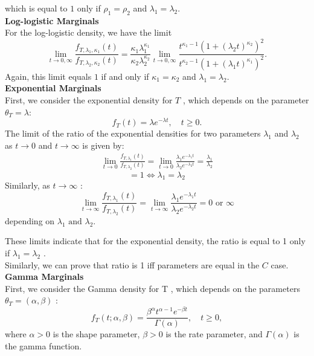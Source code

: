 which is equal to \(1\) only if \(\rho_1 = \rho_2\) and \(\lambda_1 = \lambda_2\).\\
\textbf{Log-logistic Marginals}\\
For the log-logistic density, we have the limit
\[
\lim_{t \to 0, \infty} \frac{f_{T, \lambda_1, \kappa_1}(t)}{f_{T, \lambda_2, \kappa_2}(t)} = \frac{\kappa_1 \lambda_1^{\kappa_1}}{\kappa_2 \lambda_2^{\kappa_2}} \lim_{t \to 0, \infty} \frac{t^{\kappa_1 - 1} \left(1 + (\lambda_2 t)^{\kappa_2}\right)^{2}}{t^{\kappa_2 - 1}  \left(1 + (\lambda_1 t)^{\kappa_1}\right)^{2}}.
\]
Again, this limit equals \(1\) if and only if \(\kappa_1 = \kappa_2\) and \(\lambda_1 = \lambda_2\). \\
\textbf{Exponential Marginals}\\
First, we consider the exponential density for  $T$ , which depends on the parameter  $\theta_T = \lambda$:
$$f_T(t) = \lambda e^{-\lambda t}, \quad t \geq 0.$$
The limit of the ratio of the exponential densities for two parameters  $\lambda_1$  and  $\lambda_2$  as  $t \to 0$  and  $t \to \infty$  is given by:
\begin{align*}
	\lim_{t \to 0} \frac{f_{T, \lambda_1}(t)}{f_{T, \lambda_2}(t)} = \lim_{t \to 0} \frac{\lambda_1 e^{-\lambda_1 t}}{\lambda_2 e^{-\lambda_2 t}} = \frac{\lambda_1}{\lambda_2}
\end{align*}
\begin{equation*}
	= 1 \iff \lambda_1 = \lambda_2
\end{equation*}
Similarly, as  $t \to \infty$ :
\begin{equation*}
\lim_{t \to \infty} \frac{f_{T, \lambda_1}(t)}{f_{T, \lambda_2}(t)} = \lim_{t \to \infty} \frac{\lambda_1 e^{-\lambda_1 t}}{\lambda_2 e^{-\lambda_2 t}} = 0 \text{ or } \infty 
\end{equation*}
depending on \(\lambda_1 \text{ and } \lambda_2.\)

These limits indicate that for the exponential density, the ratio is equal to  1  only if  $\lambda_1 = \lambda_2$ .\\
Similarly, we can prove that ratio is 1 iff parameters are equal in the \(C\) case.\\ 
\textbf{Gamma Marginals}\\
First, we consider the Gamma density for  T , which depends on the parameters  $\theta_T = (\alpha, \beta)$ :
$$f_T(t; \alpha, \beta) = \frac{\beta^\alpha t^{\alpha - 1} e^{-\beta t}}{\Gamma(\alpha)}, \quad t \geq 0,$$
where $\alpha > 0$  is the shape parameter,  $\beta > 0$  is the rate parameter, and  $\Gamma(\alpha)$ is the gamma function.

